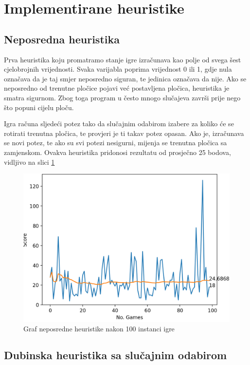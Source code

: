 \documentclass[zavrsnirad]{fer}
\begin{document}
\section{Implementirane heuristike}
\label{pog:heuristics}

\subsection{Neposredna heuristika}
\label{pog:neposredna}

Prva heuristika koju promatramo stanje igre izračunava kao polje od svega šest cjelobrojnih vrijednosti. Svaka varijabla poprima vrijednost 0 ili 1, gdje nula označava da je taj smjer neposredno siguran, te jedinica označava da nije. Ako se neposredno od trenutne pločice pojavi već postavljena pločica, heuristika je smatra sigurnom. Zbog toga program u često mnogo slučajeva završi prije nego što popuni cijelu ploču.

Igra računa sljedeći potez tako da slučajnim odabirom izabere za koliko će se rotirati trenutna pločica, te provjeri je ti takav potez opasan. Ako je, izračunava se novi potez, te ako su svi potezi nesigurni, mijenja se trenutna pločica sa zamjenskom. Ovakva heuristika pridonosi rezultatu od prosječno 25 bodova, vidljivo na slici \ref{slk:sofort_graph}

\begin{figure}[htb]
	\centering
	\includegraphics[width=0.68\linewidth]{Figures/sofort.png} 
	\caption{Graf neposredne heuristike nakon 100 instanci igre}
	\label{slk:sofort_graph}
\end{figure}


\subsection{Dubinska heuristika sa slučajnim odabirom}
\label{pog:dubinska_slucajna}
\end{document}
